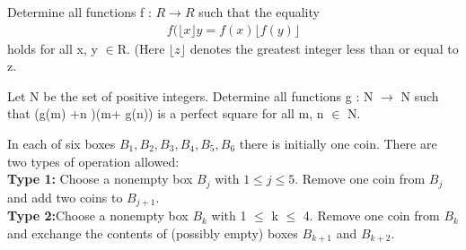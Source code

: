 \item Determine all functions f : $R \rightarrow R$ such that the equality
\begin{align*}
f(\lfloor x \rfloor y=f(x)\lfloor f(y)\rfloor
\end{align*}
holds for all x, y $\in $R. (Here $\lfloor z \rfloor$ denotes the greatest integer less than or equal to z.

\item Let N be the set of positive integers. Determine all functions g : N $\to$ N such that
(g(m) +n )(m+ g(n)) is a perfect square for all m, n $ \in $ N.
 
\item In each of six boxes $B_1, B_2, B_3, B_4, B_5, B_6$ there is initially one coin. There are two types of operation allowed:\\
\textbf{Type 1:} Choose a nonempty box $B_{j}$ with $1 \leq j \leq 5$. Remove one coin from $B_{j}$ and add two coins to $B_{j+1}$.\\
\textbf{Type 2:}Choose a nonempty box $B_k$ with 1 $\leq$ k $\leq$ 4. Remove one coin from $B_k$ and exchange the contents of (possibly empty) boxes $B_{k+1}$ and $B_{k+2}$.
